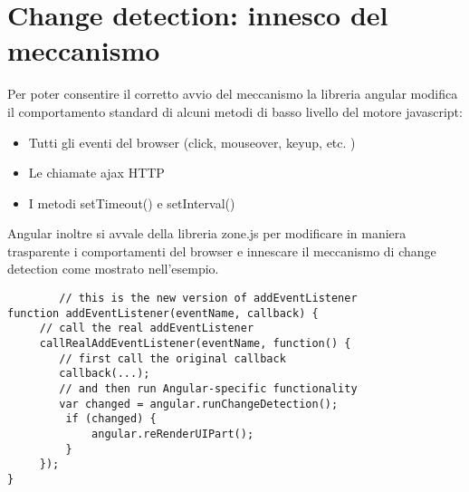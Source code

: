 \section{Change detection: innesco del meccanismo}

Per poter consentire il corretto avvio del meccanismo la libreria angular modifica il comportamento standard di alcuni metodi di basso livello del motore javascript:
\begin{itemize}
    \item Tutti gli eventi del browser (click, mouseover, keyup, etc. )
    \item Le chiamate ajax HTTP
    \item I metodi setTimeout() e setInterval()
\end{itemize}
Angular inoltre si avvale della libreria zone.js per modificare in maniera trasparente i comportamenti del browser e innescare il meccanismo di change detection come mostrato nell'esempio.
\newline
\begin{verbatim}
        // this is the new version of addEventListener
function addEventListener(eventName, callback) {
     // call the real addEventListener
     callRealAddEventListener(eventName, function() {
        // first call the original callback
        callback(...);     
        // and then run Angular-specific functionality
        var changed = angular.runChangeDetection();
         if (changed) {
             angular.reRenderUIPart();
         }
     });
}

\end{verbatim}
\cite{angular-doc}
